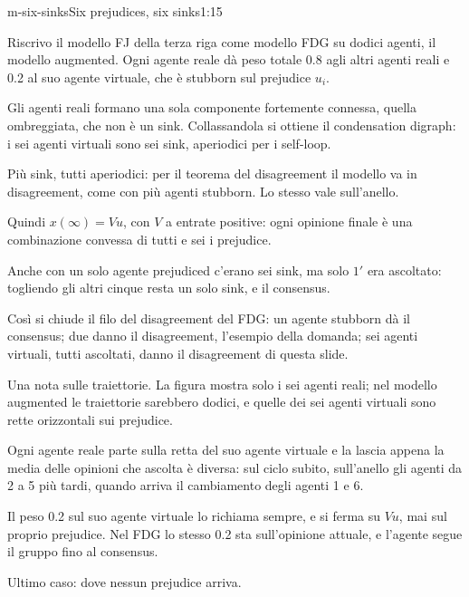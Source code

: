 \begin{slidedue}{m-six-sinks}{Six prejudices, six sinks}{1:15}
  \begin{discorso}
    \item Riscrivo il modello FJ della terza riga come modello FDG su dodici agenti, il modello augmented. Ogni agente reale dà peso totale 0.8 agli altri agenti reali e 0.2 al suo agente virtuale, che è stubborn sul prejudice $u_i$.
    \item Gli agenti reali formano una sola componente fortemente connessa, quella ombreggiata, che non è un sink. Collassandola si ottiene il condensation digraph: i sei agenti virtuali sono sei sink, aperiodici per i self-loop.
    \item Più sink, tutti aperiodici: per il teorema del disagreement il modello va in disagreement, come con più agenti stubborn. Lo stesso vale sull'anello.
    \item Quindi $x(\infty)=Vu$, con $V$ a entrate positive: ogni opinione finale è una combinazione convessa di tutti e sei i prejudice.
    \item Anche con un solo agente prejudiced c'erano sei sink, ma solo $1'$ era ascoltato: togliendo gli altri cinque resta un solo sink, e il consensus.
    \item Così si chiude il filo del disagreement del FDG: un agente stubborn dà il consensus; due danno il disagreement, l'esempio della domanda; sei agenti virtuali, tutti ascoltati, danno il disagreement di questa slide.
    \item \clic Una nota sulle traiettorie. La figura mostra solo i sei agenti reali; nel modello augmented le traiettorie sarebbero dodici, e quelle dei sei agenti virtuali sono rette orizzontali sui prejudice.
    \item Ogni agente reale parte sulla retta del suo agente virtuale e la lascia appena la media delle opinioni che ascolta è diversa: sul ciclo subito, sull'anello gli agenti da 2 a 5 più tardi, quando arriva il cambiamento degli agenti 1 e 6.
    \item Il peso 0.2 sul suo agente virtuale lo richiama sempre, e si ferma su $Vu$, mai sul proprio prejudice. Nel FDG lo stesso 0.2 sta sull'opinione attuale, e l'agente segue il gruppo fino al consensus.
    \item Ultimo caso: dove nessun prejudice arriva.
  \end{discorso}
\end{slidedue}

